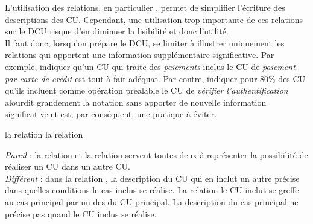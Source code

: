 \begin{bonnepratique}
	L'utilisation des relations, en particulier , permet de simplifier l'écriture des descriptions des \acrshort{CU}. Cependant, une utilisation trop importante de ces relations sur le \acrshort{DCU} risque d'en diminuer la lisibilité et donc l'utilité.\\
	
	Il faut donc, lorsqu'on prépare le \acrshort{DCU}, se limiter à illustrer uniquement les relations qui apportent une information supplémentaire significative. Par exemple, indiquer qu'un \acrshort{CU} qui traite des {\itshape paiements} inclus le \acrshort{CU} de {\itshape  paiement par carte de crédit} est tout à fait adéquat. Par contre, indiquer pour 80\% des \acrshort{CU} qu'ils incluent comme opération préalable le \acrshort{CU} de {\itshape vérifier l'authentification} alourdit grandement la notation sans apporter de nouvelle information significative et est, par conséquent, une pratique à éviter.
\end{bonnepratique}

\begin{distinction}{la relation }{la relation }
	
	{\em Pareil} : la relation  et la relation  servent toutes deux à représenter la possibilité de réaliser un \acrshort{CU} dans un autre \acrshort{CU}. \\
	
	{\em Différent } : dans la relation , la description du \acrshort{CU} qui en inclut un autre précise dans quelles conditions le cas inclus se réalise. La relation  le \acrshort{CU} inclut se greffe au cas principal par un des  du \acrshort{CU} principal. La description du cas principal ne précise pas quand le \acrshort{CU} inclus se réalise.   
\end{distinction}

